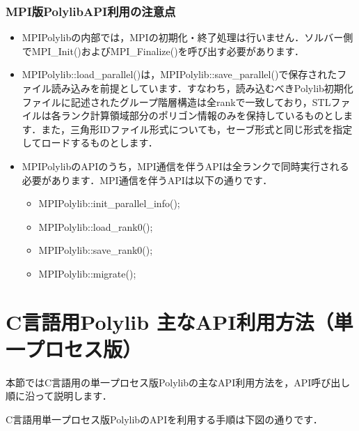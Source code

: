 {\subsubsection{MPI版PolylibAPI利用の注意点}
 
\begin{itemize}
 \item MPIPolylibの内部では，MPIの初期化・終了処理は行いません．ソルバー側でMPI\_Init()およびMPI\_Finalize()を呼び出す必要があります．
 \item MPIPolylib::load\_parallel()は，MPIPolylib::save\_parallel()で保存されたファイル読み込みを前提としています．すなわち，読み込むべきPolylib初期化ファイルに記述されたグループ階層構造は全rankで一致しており，STLファイルは各ランク計算領域部分のポリゴン情報のみを保持しているものとします．また，三角形IDファイル形式についても，セーブ形式と同じ形式を指定してロードするものとします．
 \item MPIPolylibのAPIのうち，MPI通信を伴うAPIは全ランクで同時実行される必要があります．MPI通信を伴うAPIは以下の通りです．
 \begin{itemize}
  \item MPIPolylib::init\_parallel\_info();
  \item MPIPolylib::load\_rank0();
  \item MPIPolylib::save\_rank0();
  \item MPIPolylib::migrate();
 \end{itemize}
\end{itemize}


\pagebreak

%
\section{C言語用Polylib 主なAPI利用方法（単一プロセス版）}

本節ではC言語用の単一プロセス版Polylibの主なAPI利用方法を，API呼び出し順に沿って説明します．

C言語用単一プロセス版PolylibのAPIを利用する手順は下図の通りです．

}
